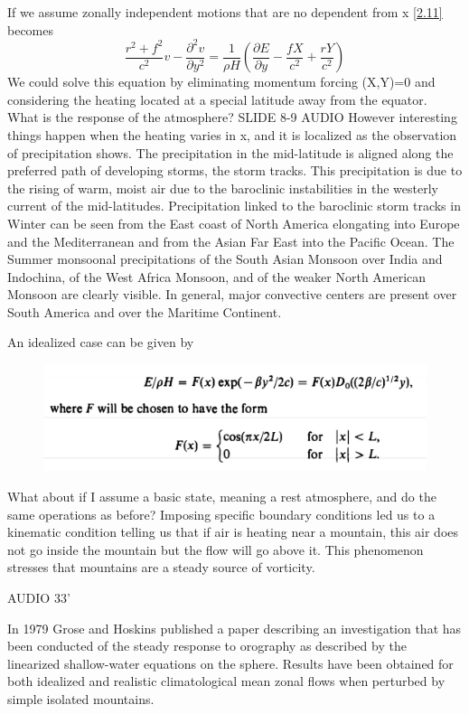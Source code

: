 If we assume zonally independent motions that are no dependent from x \ref{2.11} becomes
\begin{equation}
	\frac{r^2 + f^2}{c^2} v - \frac{\partial^2 v}{\partial y^2} = \frac{1}{\rho H} \left( \frac{\partial E}{\partial y} - \frac{fX}{c^2} + \frac{rY}{c^2} \right)
\end{equation}
We could solve this equation by eliminating momentum forcing (X,Y)=0 and considering the heating located at a special latitude away from the equator.\\[0.5 cm]

What is the response of the atmosphere?
SLIDE 8-9 AUDIO
However interesting things happen when the heating varies in x, and it is localized as the observation of precipitation shows. The precipitation in the mid-latitude is aligned along the preferred path of developing storms, the storm tracks. This precipitation is due to the rising of warm, moist air due to the baroclinic instabilities in the westerly current of the mid-latitudes. Precipitation linked to the baroclinic storm tracks in Winter can be seen from the East coast of North America elongating into Europe and the Mediterranean and from the Asian Far East into the Pacific Ocean. The Summer monsoonal precipitations of the South Asian Monsoon over India and Indochina, of the West Africa Monsoon, and of the weaker North American Monsoon are clearly visible. In general, major convective centers are present over South America and over the Maritime Continent.


An idealized case can be given by
\begin{figure}[htp!]
	\centering
	\includegraphics[width=0.5\linewidth]{uploads/22image.png}
	\label{fig:enter-label}
\end{figure}

What about if I assume a basic state, meaning a rest atmosphere, and do the same operations as before? Imposing specific boundary conditions led us to a kinematic condition telling us that if air is heating near a mountain, this air does not go inside the mountain but the flow will go above it. This phenomenon stresses that mountains are a steady source of vorticity.

AUDIO 33'

In 1979 Grose and Hoskins published a paper describing an investigation that has been conducted of the steady response to orography as described by the linearized shallow-water equations on the sphere.
Results have been obtained for both idealized and realistic climatological mean zonal flows when perturbed by simple isolated mountains.

